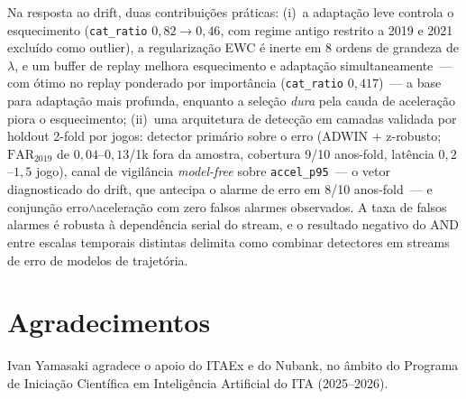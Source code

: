 \documentclass[runningheads]{llncs}
\begin{document}
Na resposta ao drift, duas contribui\c{c}\~oes pr\'aticas: (i)~a adapta\c{c}\~ao leve controla o esquecimento (\texttt{cat\_ratio} $0{,}82 \to 0{,}46$, com regime antigo restrito a 2019 e 2021 exclu\'ido como outlier), a regulariza\c{c}\~ao EWC \'e inerte em 8 ordens de grandeza de $\lambda$, e um buffer de replay melhora esquecimento e adapta\c{c}\~ao simultaneamente~--- com \'otimo no replay ponderado por import\^ancia (\texttt{cat\_ratio} $0{,}417$)~--- a base para adapta\c{c}\~ao mais profunda, enquanto a sele\c{c}\~ao \emph{dura} pela cauda de acelera\c{c}\~ao piora o esquecimento; (ii)~uma arquitetura de detec\c{c}\~ao em camadas validada por holdout 2-fold por jogos: detector prim\'ario sobre o erro (ADWIN + z-robusto; $\mathrm{FAR}_{2019}$ de $0{,}04$--$0{,}13$/1k fora da amostra, cobertura 9/10 anos-fold, lat\^encia $0{,}2$--$1{,}5$ jogo), canal de vigil\^ancia \emph{model-free} sobre \texttt{accel\_p95}~--- o vetor diagnosticado do drift, que antecipa o alarme de erro em 8/10 anos-fold~--- e conjun\c{c}\~ao erro$\wedge$acelera\c{c}\~ao com zero falsos alarmes observados. A taxa de falsos alarmes \'e robusta \`a depend\^encia serial do stream, e o resultado negativo do AND entre escalas temporais distintas delimita como combinar detectores em streams de erro de modelos de trajet\'oria.

\section*{Agradecimentos}
Ivan Yamasaki agradece o apoio do ITAEx e do Nubank, no \^ambito do Programa de Inicia\c{c}\~ao Cient\'ifica em Intelig\^encia Artificial do ITA (2025--2026).
\end{document}
